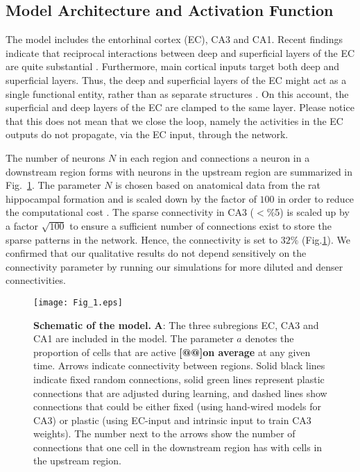 \documentclass[utf8]{frontiersSCNS} %
\begin{document}
\subsection{Model Architecture and Activation Function}


The model includes the entorhinal cortex (EC), CA3 and CA1. 
%
Recent findings indicate that reciprocal interactions between deep and superficial layers of the EC are quite substantial \citep{canto2008does, van2003morphological}. Furthermore, main cortical inputs target both deep and superficial layers. Thus, the deep and superficial layers of the EC might act as a single functional entity, rather than as separate structures \citep{kloosterman2000functional}.
%
On this account, the superficial and deep layers of the EC are clamped to the same layer. Please notice that this does not mean that we close the loop, namely the activities in the EC outputs do not propagate, via the EC input, through the network.

The number of neurons $N$ in each region and connections a neuron in a downstream region forms with neurons in the upstream region are summarized in Fig.~\ref{Fig_1}. The parameter $N$ is chosen based on anatomical data from the rat hippocampal formation \citep{amaral1990chapter, cutsuridis2010hippocampal} and is scaled down by the factor of $100$ in order to reduce the computational cost \citep[see][for details]{neher2015memory}. The sparse connectivity in CA3 ($< \%$5) \citep{guzman2016synaptic} is scaled up by a factor $\sqrt{100}$ to ensure a sufficient number of connections exist to store the sparse patterns in the network. Hence, the connectivity is set to $32\%$ (Fig.\:\ref{Fig_1}). 
%
We confirmed that our qualitative results do not depend sensitively on the connectivity parameter by running our simulations for more diluted and denser connectivities.

\begin{figure}[!htb]
\centering\texttt{[image: Fig\_1.eps]}
\caption{\textbf{Schematic of the model.} \textbf A: The three subregions EC, CA3 and CA1 are included in the model. The parameter $a$ denotes the proportion of cells that are active \textbf{[@@]on average} at any given time. Arrows indicate connectivity between regions. Solid black lines indicate fixed random connections, solid green lines represent plastic connections that are adjusted during learning, and dashed lines show connections that could be either fixed (using hand-wired models for CA3) or plastic (using EC-input and intrinsic input to train CA3 weights). The number next to the arrows show the number of connections that one cell in the downstream region has with cells in the upstream region.}
\label{Fig_1}
\end{figure}
\end{document}
